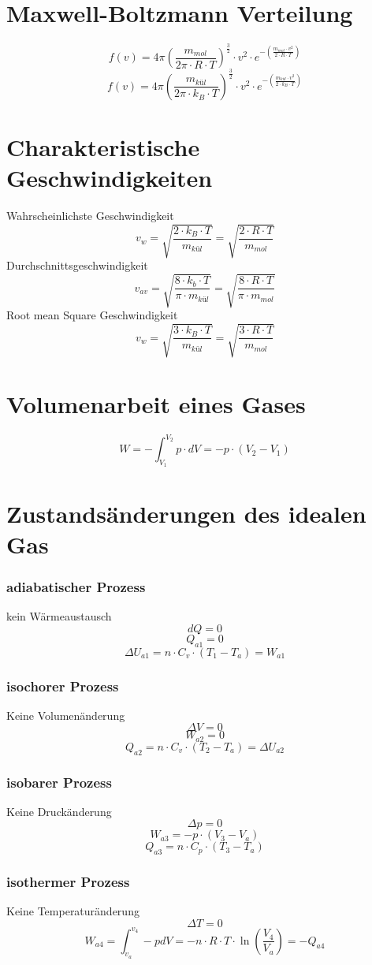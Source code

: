 \section{Maxwell-Boltzmann Verteilung}
\[ \boxed{f(v) = 4 \pi \left(\frac{m_{mol}}{2 \pi \cdot R \cdot T}\right)^{\frac{3}{2}}
\cdot v^2 \cdot e^{-\left(\frac{m_{mol} \cdot v^2}{2 \cdot R \cdot T}\right)}} \]
\[ \boxed{f(v) = 4 \pi \left(\frac{m_{kül}}{2 \pi \cdot k_B \cdot T}\right)^{\frac{3}{2}}
\cdot v^2 \cdot e^{-\left(\frac{m_{kül} \cdot v^2}{2 \cdot k_B \cdot T}\right)}} \]

\section{Charakteristische Geschwindigkeiten}
Wahrscheinlichste Geschwindigkeit
\[ \boxed{v_w = \sqrt{\frac{2 \cdot k_B \cdot T}{m_{kül}}} 
= \sqrt{\frac{2 \cdot R \cdot T}{m_{mol}}}} \]
Durchschnittsgeschwindigkeit
\[ \boxed{v_{av} = \sqrt{\frac{8 \cdot k_b \cdot T}{\pi \cdot m_{kül}}} 
= \sqrt{\frac{8 \cdot R \cdot T}{\pi \cdot m_{mol}}}} \]
Root mean Square Geschwindigkeit
\[ \boxed{v_w = \sqrt{\frac{3 \cdot k_B \cdot T}{m_{kül}}} 
= \sqrt{\frac{3 \cdot R \cdot T}{m_{mol}}}} \]

\section{Volumenarbeit eines Gases}
\[ \boxed{W = -\int_{V_1}^{V_2} p \cdot dV = - p \cdot (V_2 - V_1)} \]

\section{Zustandsänderungen des idealen Gas}

\subsubsection{adiabatischer Prozess}
kein Wärmeaustausch
\[ d Q = 0 \]
\[ Q_{a1} = 0 \]
\[ \Delta U_{a1} = n \cdot C_v \cdot (T_1 - T_a) = W_{a1} \]

\subsubsection{isochorer Prozess}
Keine Volumenänderung
\[ \Delta V = 0 \]
\[ W_{a2} = 0 \]
\[ Q_{a2} = n \cdot C_v \cdot (T_2 - T_a) = \Delta U_{a2} \]

\subsubsection{isobarer Prozess}
Keine Druckänderung
\[ \Delta p = 0 \]
\[ W_{a3} = - p \cdot (V_3 - V_a) \]
\[ Q_{a3} = n \cdot C_p \cdot (T_3 - T_a)\]

\subsubsection{isothermer Prozess}
Keine Temperaturänderung
\[ \Delta T = 0 \]
\[ W_{a4} = \int_{v_a}^{v_4} - p dV = - n \cdot R \cdot T \cdot 
\ln\left(\frac{V_4}{V_a}\right) = - Q_{a4} \]
